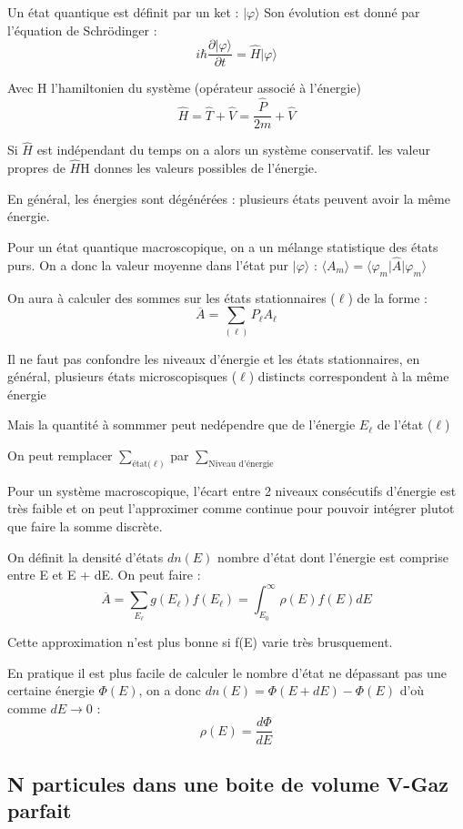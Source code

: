 \documentclass[12pt,a4paper]{report}
\begin{document}
Un état quantique est définit par un ket : \(\vert \varphi \rangle\)
Son évolution est donné par l'équation de Schrödinger :
\[
	i\hbar \dfrac{\partial \vert \varphi \rangle}{\partial t} = \hat{H} \vert \varphi \rangle
\]

Avec H l'hamiltonien du système (opérateur associé à l'énergie)
\[
	\hat{H} = \hat{T} + \hat{V} = \dfrac{\hat{P}}{2m} + \hat{V}
\]

Si \(\hat{H}\) est indépendant du temps on a alors un système conservatif. les valeur propres de \(\hat{H}\)H donnes les valeurs possibles de l'énergie.

En général, les énergies sont dégénérées : plusieurs états peuvent avoir la même énergie.

Pour un état quantique macroscopique, on a un mélange statistique des états purs.
On a donc la valeur moyenne dans l'état pur \(\vert \varphi \rangle\) : \(\langle A_m \rangle = \langle \varphi_m \vert \hat{A} \vert \varphi_m \rangle\)

On aura à calculer des sommes sur les états stationnaires (\(\ell\)) de la forme :
\[
	\overline{A} = \sum_{(\ell)} P_{\ell} A_{\ell}
\]

Il ne faut pas confondre les niveaux d'énergie et les états stationnaires, en général, plusieurs états microscopisques (\(\ell\)) distincts correspondent à la même énergie

Mais la quantité à sommmer peut nedépendre que de l'énergie \(E_\ell\) de l'état (\(\ell\))

On peut remplacer \(\sum_{\text{état(}\ell)}\) par \(\sum_{\text{Niveau d'énergie}}\)

Pour un système macroscopique, l'écart entre 2 niveaux consécutifs d'énergie est très faible et on peut l'approximer comme continue pour pouvoir intégrer plutot que faire la somme discrète.

On définit la densité d'états \(dn(E)\) nombre d'état dont l'énergie est comprise entre E et E + dE.
On peut faire :
\[
	\overline{A} = \sum_{E_\ell} g(E_\ell)f(E_\ell) = \int_{E_0}^{\infty} \rho(E)f(E) dE
\]

Cette approximation n'est plus bonne si f(E) varie très brusquement.

En pratique il est plus facile de calculer le nombre d'état ne dépassant pas une certaine énergie \(\Phi(E)\), on a donc \(dn(E) = \Phi(E+dE) - \Phi(E)\) d'où comme \(dE \rightarrow 0\) : 
\[
	\rho(E) = \dfrac{d\Phi}{dE}
\]

\subsection{N particules dans une boite de volume V-Gaz parfait}
\end{document}
